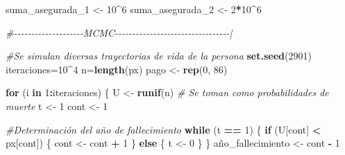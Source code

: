\documentclass[
]{article}
\newenvironment{Shaded}{\begin{snugshade}}{\end{snugshade}}
\newcommand{\CommentTok}[1]{\textcolor[rgb]{0.56,0.35,0.01}{\textit{#1}}}
\newcommand{\ControlFlowTok}[1]{\textcolor[rgb]{0.13,0.29,0.53}{\textbf{#1}}}
\newcommand{\DecValTok}[1]{\textcolor[rgb]{0.00,0.00,0.81}{#1}}
\newcommand{\FunctionTok}[1]{\textcolor[rgb]{0.13,0.29,0.53}{\textbf{#1}}}
\newcommand{\NormalTok}[1]{#1}
\newcommand{\OtherTok}[1]{\textcolor[rgb]{0.56,0.35,0.01}{#1}}
\newcommand{\SpecialCharTok}[1]{\textcolor[rgb]{0.81,0.36,0.00}{\textbf{#1}}}
\begin{document}
\begin{Shaded}
\begin{Highlighting}[]
\NormalTok{suma\_asegurada\_1 }\OtherTok{\textless{}{-}} \DecValTok{10}\SpecialCharTok{\^{}}\DecValTok{6}
\NormalTok{suma\_asegurada\_2 }\OtherTok{\textless{}{-}} \DecValTok{2}\SpecialCharTok{*}\DecValTok{10}\SpecialCharTok{\^{}}\DecValTok{6}

\CommentTok{\#{-}{-}{-}{-}{-}{-}{-}{-}{-}{-}{-}{-}{-}{-}{-}{-}{-}{-}{-}{-}MCMC{-}{-}{-}{-}{-}{-}{-}{-}{-}{-}{-}{-}{-}{-}{-}{-}{-}{-}{-}{-}{-}{-}{-}{-}{-}{-}{-}{-}{-}{-}{-}{-}{-}|   }

\CommentTok{\#Se simulan diversas trayectorias de vida de la persona}
\FunctionTok{set.seed}\NormalTok{(}\DecValTok{2901}\NormalTok{)}
\NormalTok{iteraciones}\OtherTok{=}\DecValTok{10}\SpecialCharTok{\^{}}\DecValTok{4}
\NormalTok{n}\OtherTok{=}\FunctionTok{length}\NormalTok{(px)}
\NormalTok{pago }\OtherTok{\textless{}{-}} \FunctionTok{rep}\NormalTok{(}\DecValTok{0}\NormalTok{, }\DecValTok{86}\NormalTok{)}

\ControlFlowTok{for}\NormalTok{ (i }\ControlFlowTok{in} \DecValTok{1}\SpecialCharTok{:}\NormalTok{iteraciones) \{}
\NormalTok{  U }\OtherTok{\textless{}{-}} \FunctionTok{runif}\NormalTok{(n)  }\CommentTok{\# Se toman como probabilidades de muerte}
\NormalTok{  t }\OtherTok{\textless{}{-}} \DecValTok{1}
\NormalTok{  cont }\OtherTok{\textless{}{-}} \DecValTok{1}
  
  \CommentTok{\#Determinación del año de fallecimiento}
  \ControlFlowTok{while}\NormalTok{ (t }\SpecialCharTok{==} \DecValTok{1}\NormalTok{) \{}
    \ControlFlowTok{if}\NormalTok{ (U[cont] }\SpecialCharTok{\textless{}}\NormalTok{ px[cont]) \{}
\NormalTok{      cont }\OtherTok{\textless{}{-}}\NormalTok{ cont }\SpecialCharTok{+} \DecValTok{1}
\NormalTok{    \} }\ControlFlowTok{else}\NormalTok{ \{}
\NormalTok{      t }\OtherTok{\textless{}{-}} \DecValTok{0}
\NormalTok{    \}}
\NormalTok{  \}}
\NormalTok{  año\_fallecimiento }\OtherTok{\textless{}{-}}\NormalTok{ cont }\SpecialCharTok{{-}} \DecValTok{1}
  

\end{Highlighting}
\end{Shaded}
\end{document}
